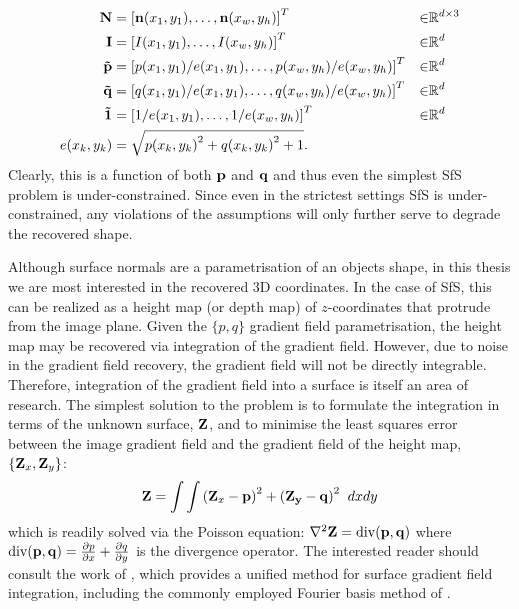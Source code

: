 \begin{align*}
    \boldsymbol{\mathbf{N}} &= {[\boldsymbol{\mathbf{n}}(x_1, y_1), \ldots, \boldsymbol{\mathbf{n}}(x_w, y_h)]}^T &\in &\mathbb{R}^{d \times 3} \\
	\boldsymbol{\mathbf{I}} &= {[I(x_1, y_1), \ldots, I(x_w, y_h)]}^T &\in &\mathbb{R}^{d} \\
	\boldsymbol{\mathbf{\tilde{p}}} &= {[p(x_1, y_1) / e(x_1, y_1), \ldots, p(x_w, y_h) / e(x_w, y_h)]}^T &\in &\mathbb{R}^{d} \\
	\boldsymbol{\mathbf{\tilde{q}}} &= {[q(x_1, y_1) / e(x_1, y_1), \ldots, q(x_w, y_h) / e(x_w, y_h)]}^T &\in &\mathbb{R}^{d} \\
 	\boldsymbol{\mathbf{\tilde{1}}} &= {[1 / e(x_1, y_1), \ldots, 1 / e(x_w, y_h)]}^T &\in &\mathbb{R}^{d} \\
	e(x_k, y_k) &= \sqrt{{p(x_k, y_k)}^2 + {q(x_k, y_k)}^2 + 1}. & &
\end{align*}
Clearly, this is a function of both $\boldsymbol{\mathbf{p}}$ and $\boldsymbol{\mathbf{q}}$ and thus even
the simplest SfS problem is under-constrained. Since
even in the strictest settings SfS is under-constrained, any violations
of the assumptions will only further serve to degrade the recovered shape.

Although surface normals
are a parametrisation of an objects shape, in this thesis we are most
interested in the recovered 3D coordinates. In the case of SfS, this can be
realized as a height map (or depth map) of $z$-coordinates that protrude
from the image plane. Given the $\{p, q\}$ gradient field parametrisation, the
height map may be recovered via integration of the gradient field. However,
due to noise in the gradient field recovery, the gradient field will not be
directly integrable. Therefore, integration of the gradient field into a
surface is itself an area of research. The simplest solution to the
problem is to formulate the integration in terms of the unknown surface,
$\boldsymbol{\mathbf{Z}}$, and to minimise the least squares error~\cite{horn1990height,simchony1990direct,agrawal2006range}
between the image gradient field and the gradient field of the height map,
$\{\boldsymbol{\mathbf{Z}}_x, \boldsymbol{\mathbf{Z}}_y\}$:
\begin{equation}\label{eq:bg_sfs_gradient_field_ls}
    \boldsymbol{\mathbf{Z}} = \int \int {(\boldsymbol{\mathbf{Z}}_x - \boldsymbol{\mathbf{p}})}^2 + {(\boldsymbol{\mathbf{Z_y}} - \boldsymbol{\mathbf{q}})}^2 \;\; dx dy
\end{equation}
which is readily solved via the Poisson equation:
$\nabla^2 \boldsymbol{\mathbf{Z}} = \operatorname{div}(\boldsymbol{\mathbf{p}}, \boldsymbol{\mathbf{q}})$ where
$\operatorname{div}(\boldsymbol{\mathbf{p}}, \boldsymbol{\mathbf{q}}) = \frac{\partial p}{\partial x} + \frac{\partial q}{\partial y}$
is the divergence operator. The interested reader should consult the
work of \citet{agrawal2006range}, which provides a unified method for
surface gradient field integration, including the commonly employed Fourier
basis method of \citet{frankot1988method}.

